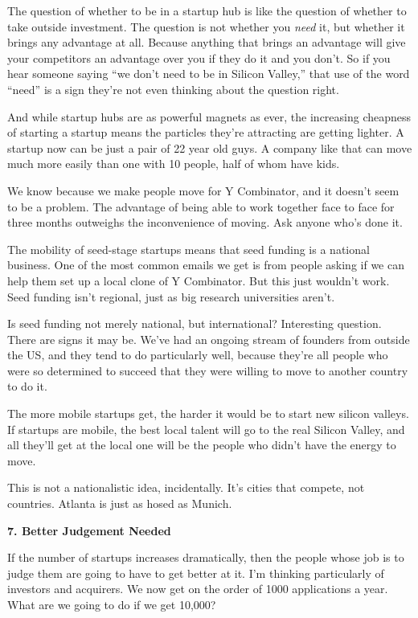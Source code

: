 The question of whether to be in a startup hub is like the question of
whether to take outside investment. The question is not whether you
\emph{need} it, but whether it brings any advantage at all. Because
anything that brings an advantage will give your competitors an
advantage over you if they do it and you don't. So if you hear someone
saying ``we don't need to be in Silicon Valley,'' that use of the word
``need'' is a sign they're not even thinking about the question right.

And while startup hubs are as powerful magnets as ever, the increasing
cheapness of starting a startup means the particles they're attracting
are getting lighter. A startup now can be just a pair of 22 year old
guys. A company like that can move much more easily than one with 10
people, half of whom have kids.

We know because we make people move for Y Combinator, and it doesn't
seem to be a problem. The advantage of being able to work together face
to face for three months outweighs the inconvenience of moving. Ask
anyone who's done it.

The mobility of seed-stage startups means that seed funding is a
national business. One of the most common emails we get is from people
asking if we can help them set up a local clone of Y Combinator. But
this just wouldn't work. Seed funding isn't regional, just as big
research universities aren't.

Is seed funding not merely national, but international? Interesting
question. There are signs it may be. We've had an ongoing stream of
founders from outside the US, and they tend to do particularly well,
because they're all people who were so determined to succeed that they
were willing to move to another country to do it.

The more mobile startups get, the harder it would be to start new
silicon valleys. If startups are mobile, the best local talent will go
to the real Silicon Valley, and all they'll get at the local one will be
the people who didn't have the energy to move.

This is not a nationalistic idea, incidentally. It's cities that
compete, not countries. Atlanta is just as hosed as Munich.

\textbf{7. Better Judgement Needed}

If the number of startups increases dramatically, then the people whose
job is to judge them are going to have to get better at it. I'm thinking
particularly of investors and acquirers. We now get on the order of 1000
applications a year. What are we going to do if we get 10,000?

